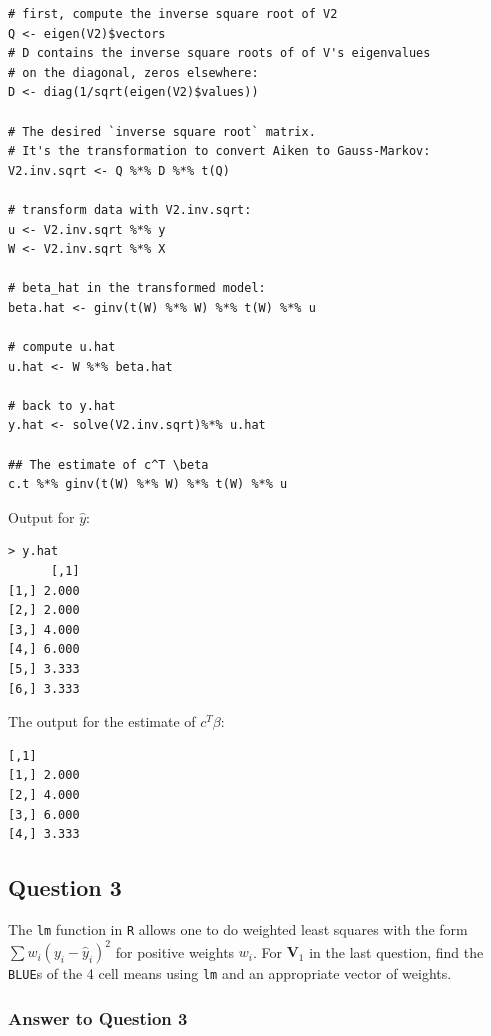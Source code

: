 \documentclass[paper=a4, fontsize=11pt]{scrartcl} %
\newcommand{\matV}{\mathbf{V}}
\begin{document}
\begin{enumerate}[(a)]
\begin{lstlisting}[basicstyle=\ttfamily\small\bfseries]
# first, compute the inverse square root of V2
Q <- eigen(V2)$vectors              
# D contains the inverse square roots of of V's eigenvalues 
# on the diagonal, zeros elsewhere:
D <- diag(1/sqrt(eigen(V2)$values))

# The desired `inverse square root` matrix.
# It's the transformation to convert Aiken to Gauss-Markov:
V2.inv.sqrt <- Q %*% D %*% t(Q)  

# transform data with V2.inv.sqrt:
u <- V2.inv.sqrt %*% y
W <- V2.inv.sqrt %*% X

# beta_hat in the transformed model:
beta.hat <- ginv(t(W) %*% W) %*% t(W) %*% u

# compute u.hat
u.hat <- W %*% beta.hat

# back to y.hat
y.hat <- solve(V2.inv.sqrt)%*% u.hat

## The estimate of c^T \beta
c.t %*% ginv(t(W) %*% W) %*% t(W) %*% u
\end{lstlisting}


Output for $\hat y$:

\begin{lstlisting}[basicstyle=\ttfamily\small\bfseries]
> y.hat
      [,1]
[1,] 2.000
[2,] 2.000
[3,] 4.000
[4,] 6.000
[5,] 3.333
[6,] 3.333
\end{lstlisting}

The output for the estimate of $ c^T  \beta $:
\begin{lstlisting}[basicstyle=\ttfamily\small\bfseries]
      [,1]
[1,] 2.000
[2,] 4.000
[3,] 6.000
[4,] 3.333
\end{lstlisting}
\end{enumerate}



\pagebreak

\subsection*{Question 3}
The \texttt{lm} function in \texttt{R} allows one to do weighted least squares with the form
$\sum w_i (y_i - \hat y_i)^2$ for positive weights $w_i$. For $\matV_1$ in the last question,
find the \texttt{BLUE}s of the 4 cell means using \texttt{lm} and an appropriate vector of weights.

\bigskip
\subsubsection*{Answer to Question 3}
\end{document}
